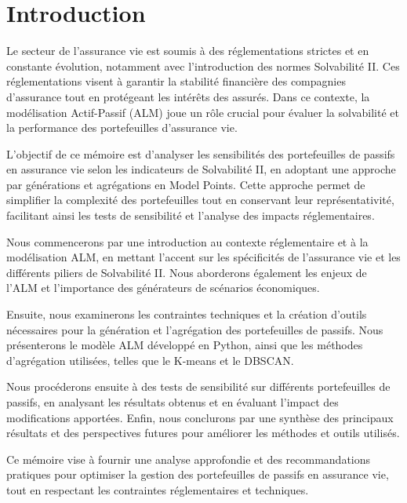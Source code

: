 \chapter*{Introduction}
Le secteur de l'assurance vie est soumis à des réglementations strictes et en constante évolution, notamment avec l'introduction des normes Solvabilité II. Ces réglementations visent à garantir la stabilité financière des compagnies d'assurance tout en protégeant les intérêts des assurés. Dans ce contexte, la modélisation Actif-Passif (ALM) joue un rôle crucial pour évaluer la solvabilité et la performance des portefeuilles d'assurance vie.

L'objectif de ce mémoire est d'analyser les sensibilités des portefeuilles de passifs en assurance vie selon les indicateurs de Solvabilité II, en adoptant une approche par générations et agrégations en Model Points. Cette approche permet de simplifier la complexité des portefeuilles tout en conservant leur représentativité, facilitant ainsi les tests de sensibilité et l'analyse des impacts réglementaires.

Nous commencerons par une introduction au contexte réglementaire et à la modélisation ALM, en mettant l'accent sur les spécificités de l'assurance vie et les différents piliers de Solvabilité II. Nous aborderons également les enjeux de l'ALM et l'importance des générateurs de scénarios économiques.

Ensuite, nous examinerons les contraintes techniques et la création d'outils nécessaires pour la génération et l'agrégation des portefeuilles de passifs. Nous présenterons le modèle ALM développé en Python, ainsi que les méthodes d'agrégation utilisées, telles que le K-means et le DBSCAN.

Nous procéderons ensuite à des tests de sensibilité sur différents portefeuilles de passifs, en analysant les résultats obtenus et en évaluant l'impact des modifications apportées. Enfin, nous conclurons par une synthèse des principaux résultats et des perspectives futures pour améliorer les méthodes et outils utilisés.

Ce mémoire vise à fournir une analyse approfondie et des recommandations pratiques pour optimiser la gestion des portefeuilles de passifs en assurance vie, tout en respectant les contraintes réglementaires et techniques.
